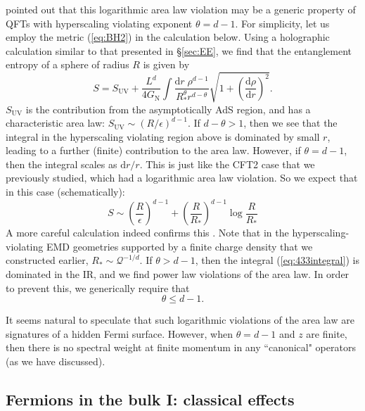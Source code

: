 \documentclass[10pt, oneside]{book}
\begin{document}
\begin{doublespace}
\cite{Huijse:2011ef} pointed out that this logarithmic area law violation may be a generic property of QFTs with hyperscaling violating exponent $\theta=d-1$.  For simplicity, let us employ the metric (\ref{eq:BH2}) in the calculation below.  Using a holographic calculation similar to that presented in \S\ref{sec:EE}, we find that the entanglement entropy of a sphere of radius $R$ is given by \begin{equation}
S = S_{\mathrm{UV}} + \frac{L^d}{4G_{\mathrm{N}}} \int \frac{\mathrm{d}r \; \rho^{d-1}}{R_*^\theta r^{d-\theta}} \sqrt{1+\left(\frac{\mathrm{d}\rho}{\mathrm{d}r}\right)^2} . \label{eq:433integral}
\end{equation}
$S_{\mathrm{UV}}$ is the contribution from the asymptotically AdS region, and has a characteristic area law:  $S_{\mathrm{UV}}\sim(R/\epsilon)^{d-1}$.   If $d-\theta>1$,  then we see that the integral in the hyperscaling violating region above is dominated by small $r$, leading to a further (finite) contribution to the area law.    However, if $\theta=d-1$,  then the integral scales as $\mathrm{d}r/r$.   This is just like the CFT2 case that we previously studied, which had a logarithmic area law violation.  So we expect that in this case (schematically):  \begin{equation}
S \sim  \left(\frac{R}{\epsilon}\right)^{d-1} + \left(\frac{R}{R_*}\right)^{d-1} \log \frac{R}{R_*}
\end{equation}
A more careful calculation indeed confirms this \cite{Huijse:2011ef}.   Note that in the hyperscaling-violating EMD geometries supported by a finite charge density that we constructed earlier, $R_* \sim \mathcal{Q}^{-1/d}$.    If $\theta > d-1$, then  the integral (\ref{eq:433integral}) is dominated in the IR, and we find power law violations of the area law.   In order to prevent this, we generically require that \begin{equation}
\theta \le d-1.
\end{equation}

It seems natural to speculate that such logarithmic violations of the area law are signatures of a hidden Fermi surface.   However, when $\theta=d-1$ and $z$ are finite, then there is no spectral weight at finite momentum in any ``canonical" operators (as we have discussed).

\subsection{Fermions in the bulk I:  classical effects}

\end{doublespace}
\end{document}
